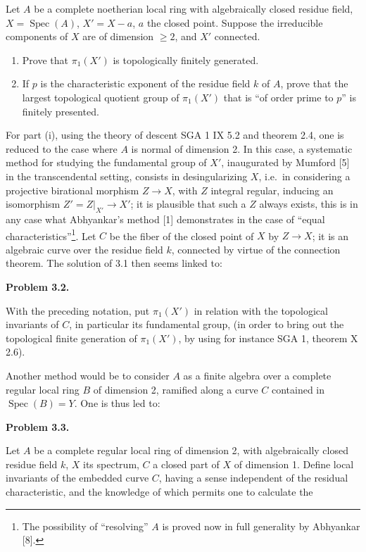 \documentclass[
]{article}
\begin{document}
Let \(A\) be a complete noetherian local ring with algebraically closed
residue field, \(X = \operatorname{Spec}(A)\), \(X' = X - {a}\), \(a\)
the closed point. Suppose the irreducible components of \(X\) are of
dimension \(\geqslant 2\), and \(X'\) connected.

\begin{enumerate}
\def\labelenumi{(\roman{enumi})}
\item
  Prove that \(\pi_{1}(X')\) is topologically finitely generated.
\item
  If \(p\) is the characteristic exponent of the residue field \(k\) of
  \(A\), prove that the largest topological quotient group of
  \(\pi_{1}(X')\) that is ``of order prime to \(p\)'' is finitely
  presented.
\end{enumerate}

For part (i), using the theory of descent SGA 1 IX 5.2 and theorem 2.4,
one is reduced to the case where \(A\) is normal of dimension 2. In this
case, a systematic method for studying the fundamental group of \(X'\),
inaugurated by Mumford {[}5{]} in the transcendental setting, consists
in desingularizing \(X\), i.e.~in considering a projective birational
morphism \(Z \to X\), with \(Z\) integral regular, inducing an
isomorphism \(Z' = Z|_{X'} \to X'\); it is plausible that such a \(Z\)
always exists, this is in any case what Abhyankar's method {[}1{]}
demonstrates in the case of ``equal characteristics''\footnote{The
  possibility of ``resolving'' \(A\) is proved now in full generality by
  Abhyankar {[}8{]}.}. Let \(C\) be the fiber of the closed point of
\(X\) by \(Z \to X\); it is an algebraic curve over the residue field
\(k\), connected by virtue of the connection theorem. The solution of
3.1 then seems linked to:

\textbf{Problem 3.2.}

With the preceding notation, put \(\pi_{1}(X')\) in relation with the
topological invariants of \(C\), in particular its fundamental group,
(in order to bring out the topological finite generation of
\(\pi_{1}(X')\), by using for instance SGA 1, theorem X 2.6).

Another method would be to consider \(A\) as a finite algebra over a
complete regular local ring \(B\) of dimension 2, ramified along a curve
\(C\) contained in \(\operatorname{Spec}(B) = Y\). One is thus led to:

\textbf{Problem 3.3.}

Let \(A\) be a complete regular local ring of dimension 2, with
algebraically closed residue field \(k\), \(X\) its spectrum, \(C\) a
closed part of \(X\) of dimension 1. Define local invariants of the
embedded curve \(C\), having a sense independent of the residual
characteristic, and the knowledge of which permits one to calculate the
\end{document}
